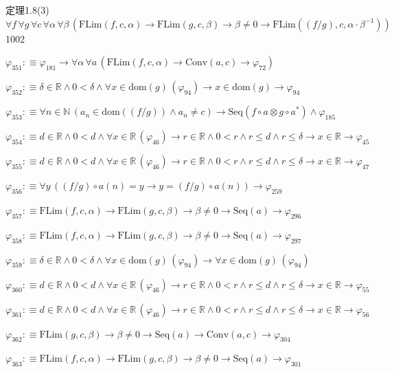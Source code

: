 \begin{fullproof}{定理1.8(3)}{$\forall f\,\forall g\,\forall c\,\forall \alpha\,\forall \beta\,(\mathrm{FLim}(f,c,\alpha) \to \mathrm{FLim}(g,c,\beta) \to \beta \neq 0 \to \mathrm{FLim}((f / g),c,\alpha \cdot \beta^{-1}))$}{1002}
\begin{abbrevlist}
\item $\varphi_{351} :\equiv \varphi_{181} \to \forall \alpha\,\forall a\,(\mathrm{FLim}(f,c,\alpha) \to \mathrm{Conv}(a,c) \to \varphi_{72})$
\item $\varphi_{352} :\equiv \delta \in \mathbb{R} \land 0 < \delta \land \forall x \in \mathrm{dom}(g)\,(\varphi_{94}) \to x \in \mathrm{dom}(g) \to \varphi_{94}$
\item $\varphi_{353} :\equiv \forall n \in \mathbb{N}\,(a_{n} \in \mathrm{dom}((f / g)) \land a_{n} \neq c) \to \mathrm{Seq}(f \circ a \otimes g \circ a^{\ast}) \land \varphi_{185}$
\item $\varphi_{354} :\equiv d \in \mathbb{R} \land 0 < d \land \forall x \in \mathbb{R}\,(\varphi_{46}) \to r \in \mathbb{R} \land 0 < r \land r \leq d \land r \leq \delta \to x \in \mathbb{R} \to \varphi_{45}$
\item $\varphi_{355} :\equiv d \in \mathbb{R} \land 0 < d \land \forall x \in \mathbb{R}\,(\varphi_{46}) \to r \in \mathbb{R} \land 0 < r \land r \leq d \land r \leq \delta \to x \in \mathbb{R} \to \varphi_{47}$
\item $\varphi_{356} :\equiv \forall y\,((f / g) \circ a(n) = y \to y = (f / g) \circ a(n)) \to \varphi_{259}$
\item $\varphi_{357} :\equiv \mathrm{FLim}(f,c,\alpha) \to \mathrm{FLim}(g,c,\beta) \to \beta \neq 0 \to \mathrm{Seq}(a) \to \varphi_{296}$
\item $\varphi_{358} :\equiv \mathrm{FLim}(f,c,\alpha) \to \mathrm{FLim}(g,c,\beta) \to \beta \neq 0 \to \mathrm{Seq}(a) \to \varphi_{297}$
\item $\varphi_{359} :\equiv \delta \in \mathbb{R} \land 0 < \delta \land \forall x \in \mathrm{dom}(g)\,(\varphi_{94}) \to \forall x \in \mathrm{dom}(g)\,(\varphi_{94})$
\item $\varphi_{360} :\equiv d \in \mathbb{R} \land 0 < d \land \forall x \in \mathbb{R}\,(\varphi_{46}) \to r \in \mathbb{R} \land 0 < r \land r \leq d \land r \leq \delta \to x \in \mathbb{R} \to \varphi_{55}$
\item $\varphi_{361} :\equiv d \in \mathbb{R} \land 0 < d \land \forall x \in \mathbb{R}\,(\varphi_{46}) \to r \in \mathbb{R} \land 0 < r \land r \leq d \land r \leq \delta \to x \in \mathbb{R} \to \varphi_{56}$
\item $\varphi_{362} :\equiv \mathrm{FLim}(g,c,\beta) \to \beta \neq 0 \to \mathrm{Seq}(a) \to \mathrm{Conv}(a,c) \to \varphi_{304}$
\item $\varphi_{363} :\equiv \mathrm{FLim}(f,c,\alpha) \to \mathrm{FLim}(g,c,\beta) \to \beta \neq 0 \to \mathrm{Seq}(a) \to \varphi_{301}$

\end{abbrevlist}
\end{fullproof}
